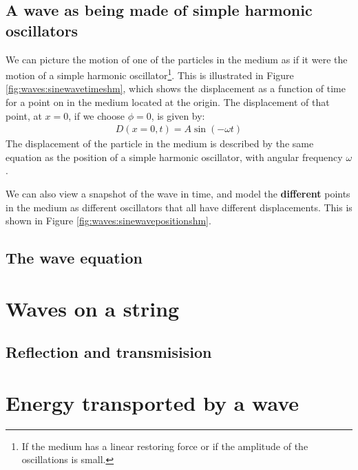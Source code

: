 \subsection{A wave as being made of simple harmonic oscillators}
We can picture the motion of one of the particles in the medium as if it were the motion of a simple harmonic oscillator\footnote{If the medium has a linear restoring force or if the amplitude of the oscillations is small.}. This is illustrated in Figure \ref{fig:waves:sinewavetimeshm}, which shows the displacement as a function of time for a point on in the medium located at the origin. The displacement of that point, at $x=0$, if we choose $\phi=0$, is given by:
\begin{align*}
D(x=0,t) = A\sin(-\omega t)
\end{align*}
The displacement of the particle in the medium is described by the same equation as the position of a simple harmonic oscillator, with angular frequency $\omega$. 

We can also view a snapshot of the wave in time, and model the \textbf{different} points in the medium as different oscillators that all have different displacements. This is shown in Figure \ref{fig:waves:sinewavepositionshm}.

\subsection{The wave equation}

\section{Waves on a string}

\subsection{Reflection and transmisision}

\section{Energy transported by a wave}

